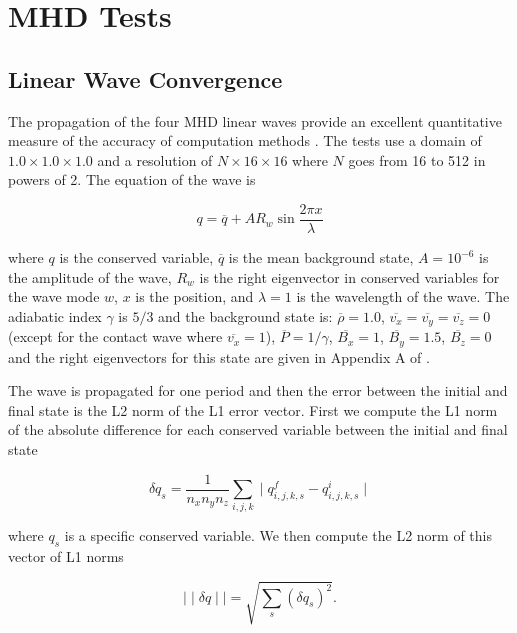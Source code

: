 \section{MHD Tests}
\label{sec:mhd-tests}

\subsection{Linear Wave Convergence}
\label{sec:lwc}

The propagation of the four MHD linear waves provide an excellent quantitative measure of the accuracy of computation methods \citep{stone_2009}. The tests use a domain of $1.0\times1.0\times1.0$ and a resolution of $N\times16\times16$ where $N$ goes from 16 to 512 in powers of 2. The equation of the wave is

\begin{equation}
    q = \overline{q} + A R_w \sin{\frac{2\pi x}{\lambda}}
\end{equation}

where $q$ is the conserved variable, $\overline{q}$ is the mean background state, $A=10^{-6}$ is the amplitude of the wave, $R_w$ is the right eigenvector in conserved variables for the wave mode $w$, $x$ is the position, and $\lambda=1$ is the wavelength of the wave. The adiabatic index $\gamma$ is $5/3$ and the background state is: 
$\overline{\rho}=1.0$,
$\overline{v_x}=\overline{v_y}=\overline{v_z}=0$ (except for the contact wave where $\overline{v_x} = 1$),
$\overline{P}=1/\gamma$,
$\overline{B_x}=1$,
$\overline{B_y}=1.5$,
$\overline{B_z}=0$ 
and the right eigenvectors for this state are given in Appendix A of \cite{gardiner_unsplit_2008}. 

The wave is propagated for one period and then the error between the initial and final state is the L2 norm of the L1 error vector. First we compute the L1 norm of the absolute difference for each conserved variable between the initial and final state

\begin{equation}
    \delta q_s = \frac{1}{n_x n_y n_z} \sum_{i,j,k} \mid q^f_{i,j,k,s} - q^i_{i,j,k,s} \mid
\end{equation}

where $q_s$ is a specific conserved variable. We then compute the L2 norm of this vector of L1 norms

\begin{equation}
    \mid \mid \delta q \mid \mid = \sqrt{\sum_s \left( \delta q_s \right)^2}.
\end{equation}

